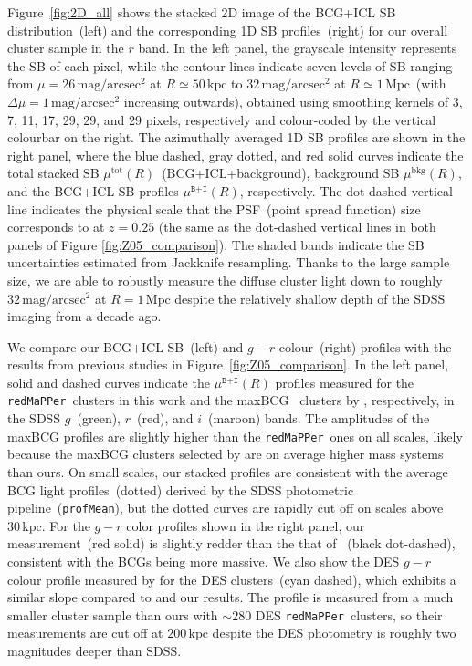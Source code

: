 \documentclass[fleqn,usenatbib]{mnras}
\newcommand{\mubi}{\mu^{\texttt{B+I}}}
\newcommand{\sbmag}{\mathrm{mag}/\mathrm{arcsec}^{2}}
\newcommand{\mpc}{\mathrm{Mpc}}
\newcommand{\kpc}{\mathrm{kpc}}
\newcommand\redmapper{\texttt{redMaPPer}}
\begin{document}
Figure~\ref{fig:2D_all} shows the stacked 2D image of the BCG+ICL SB
distribution~(left) and the corresponding 1D SB profiles~(right) for our
overall cluster sample in the $r$ band. In the left panel, the grayscale
intensity represents the SB of each pixel, while the contour lines indicate
seven levels of SB ranging from $\mu{=}26\,\sbmag$ at $R{\simeq}50\,\kpc$
to $32\,\sbmag$ at $R{\simeq}1\,\mpc$~(with $\Delta \mu{=}1\,\sbmag$
increasing outwards),
obtained using smoothing kernels of 3, 7, 11, 17, 29, 29, and 29 pixels,
respectively and colour-coded by the vertical colourbar on the right.
The azimuthally averaged 1D SB profiles are shown in the
right panel, where the blue dashed, gray dotted, and red solid curves
indicate the total stacked SB $\mu^{\mathrm{tot}}(R)$~(BCG+ICL+background),
background SB $\mu^{\mathrm{bkg}}(R)$, and the BCG+ICL SB profiles
$\mubi(R)$, respectively. The dot-dashed vertical line indicates the
physical scale that the PSF~(point spread function) size corresponds to at
$z{=}0.25$ (the same as the dot-dashed vertical lines in both panels of
Figure \ref{fig:Z05_comparison}).  The shaded bands indicate the SB
uncertainties estimated from Jackknife resampling. Thanks to the large
sample size, we are able to robustly measure the diffuse cluster light down
to roughly $32\,\sbmag$ at $R{=}1\,\mpc$ despite the relatively shallow
depth of the SDSS imaging from a decade ago.


We compare our BCG+ICL SB~(left) and $g{-}r$ colour~(right) profiles with
the results from previous studies in Figure~\ref{fig:Z05_comparison}. In
the left panel, solid and dashed curves indicate the $\mubi(R)$ profiles
measured for the \redmapper~clusters in this work and the
maxBCG~\citep{Koester2007} clusters by ,
respectively, in the SDSS $g$~(green), $r$~(red), and $i$~(maroon) bands.
The amplitudes of the maxBCG profiles are slightly higher than the
\redmapper~ones on all scales, likely because the maxBCG clusters selected
by  are on average higher mass systems than ours.
On small scales, our stacked profiles are consistent with the average BCG
light profiles~(dotted) derived by the SDSS photometric
pipeline~(\texttt{profMean}), but the dotted curves are rapidly cut off on
scales above $30\,\kpc$.  For the $g{-}r$ color profiles shown in the right
panel, our measurement~(red solid) is slightly redder than the that of
~(black dot-dashed), consistent with the
 BCGs being more massive. We also show the DES
$g{-}r$ colour profile measured by \citet{Zhang2019}  for the DES
clusters~(cyan dashed), which exhibits a similar slope compared to
 and our results. The \citeauthor{Zhang2019}
profile is measured from a much smaller cluster sample than ours with
${\sim}280$ DES \redmapper~clusters, so their measurements are cut off at
$200\,\kpc$ despite the DES photometry is roughly two magnitudes deeper
than SDSS.
\end{document}
